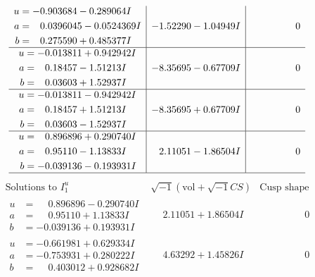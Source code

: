 \documentclass[1p]{elsarticle_modified}
\theoremstyle{definition}
\newcommand{\I}{\sqrt{-1}}
\begin{document}
$$\begin{array}{c|c|c}
\begin{aligned}
u &= -0.903684 - 0.289064 I \\
a &= \phantom{-}0.0396045 - 0.0524369 I \\
b &= \phantom{-}0.275590 + 0.485377 I\end{aligned}
 & -1.52290 - 1.04949 I & \phantom{-0.000000 } 0 \\ \hline\begin{aligned}
u &= -0.013811 + 0.942942 I \\
a &= \phantom{-}0.18457 - 1.51213 I \\
b &= \phantom{-}0.03603 + 1.52937 I\end{aligned}
 & -8.35695 - 0.67709 I & \phantom{-0.000000 } 0 \\ \hline\begin{aligned}
u &= -0.013811 - 0.942942 I \\
a &= \phantom{-}0.18457 + 1.51213 I \\
b &= \phantom{-}0.03603 - 1.52937 I\end{aligned}
 & -8.35695 + 0.67709 I & \phantom{-0.000000 } 0 \\ \hline\begin{aligned}
u &= \phantom{-}0.896896 + 0.290740 I \\
a &= \phantom{-}0.95110 - 1.13833 I \\
b &= -0.039136 - 0.193931 I\end{aligned}
 & \phantom{-}2.11051 - 1.86504 I & \phantom{-0.000000 } 0\\
 \hline 
 \end{array}$$\newpage$$\begin{array}{c|c|c}  
\text{Solutions to }I^u_{1}& \I (\text{vol} + \sqrt{-1}CS) & \text{Cusp shape}\\
 \hline 
\begin{aligned}
u &= \phantom{-}0.896896 - 0.290740 I \\
a &= \phantom{-}0.95110 + 1.13833 I \\
b &= -0.039136 + 0.193931 I\end{aligned}
 & \phantom{-}2.11051 + 1.86504 I & \phantom{-0.000000 } 0 \\ \hline\begin{aligned}
u &= -0.661981 + 0.629334 I \\
a &= -0.753931 + 0.280222 I \\
b &= \phantom{-}0.403012 + 0.928682 I\end{aligned}
 & \phantom{-}4.63292 + 1.45826 I & \phantom{-0.000000 } 0 \\ \hline\begin{aligned}

\end{aligned}
\end{array}$$
\end{document}
